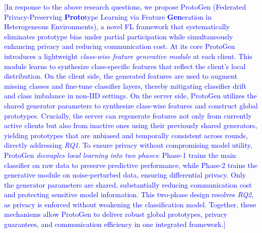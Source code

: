 \documentclass[lettersize,journal]{IEEEtran}
\newcommand{\todoa}[1]{\textcolor{blue}{[#1]}}
\begin{document}


\todoa{In response to the above research questions, we propose \textsf{ProtoGen} (Federated Privacy-Preserving \textbf{Proto}type Learning via Feature \textbf{Gen}eration in Heterogeneous Environments), a novel FL framework that systematically eliminates prototype bias under partial participation while simultaneously enhancing privacy and reducing communication cost. At its core \textsf{ProtoGen} introduces a lightweight \emph{class-wise feature generative module} at each client. This module learns to synthesize class-specific features that reflect the client’s local distribution. On the client side, the generated features are used to augment missing classes and fine-tune classifier layers, thereby mitigating classifier drift and class imbalance in non-IID settings. On the server side, \textsf{ProtoGen} utilizes the shared generator parameters to synthesize class-wise features and construct global prototypes. Crucially, the server can regenerate features not only from currently active clients but also from inactive ones using their previously shared generators, yielding prototypes that are unbiased and temporally consistent across rounds, directly addressing \textit{RQ1}. To ensure privacy without compromising model utility, \textsf{ProtoGen} \emph{decouples local learning into two phases}: Phase-1 trains the main classifier on raw data to preserve predictive performance, while Phase-2 trains the generative module on noise-perturbed data, ensuring differential privacy. Only the generator parameters are shared, substantially reducing communication cost and protecting sensitive model information. This two-phase design resolves \textit{RQ2}, as privacy is enforced without weakening the classification model. Together, these mechanisms allow \textsf{ProtoGen} to deliver robust global prototypes, privacy guarantees, and communication efficiency in one integrated framework.} 
\end{document}
